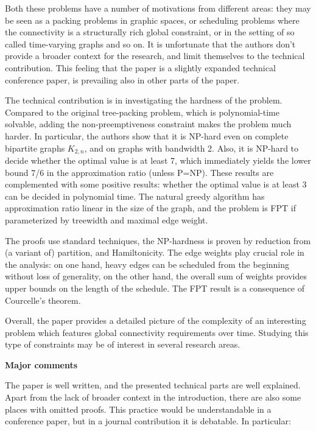 \documentclass[11pt,a4paper]{article}
\begin{document}
Both these problems have a number of motivations from different areas: they may
be seen as a packing problems in graphic spaces, or scheduling problems where
the connectivity is a structurally rich global constraint, or in the setting of
so called time-varying graphs and so on. It is unfortunate that the authors
don't provide a broader context for the research, and limit themselves to the
technical contribution. This feeling that the paper is a slightly expanded
technical conference paper, is prevailing also in other parts of the paper.

The technical contribution is in investigating the hardness of the problem.
Compared to the original tree-packing problem, which is polynomial-time
solvable, adding the non-preemptiveness constraint makes the problem much
harder.  In particular, the authors show that it is NP-hard even on complete
bipartite graphs $K_{2,n}$, and on graphs with bandwidth 2. Also, it is NP-hard to
decide whether the optimal value is at least 7, which immediately yields the
lower bound 7/6 in the approximation ratio (unless P=NP). These results are
complemented with some positive results: whether the optimal value is at least 3
can be decided in polynomial time. The natural greedy algorithm has
approximation ratio linear in the size of the graph, and the problem is FPT if
parameterized by treewidth and maximal edge weight.

The proofs use standard techniques, the NP-hardness is proven by reduction from
(a variant of) partition, and Hamiltonicity. The edge weights play crucial role
in the analysis: on one hand, heavy edges can be scheduled from the beginning
without loss of generality, on the other hand, the overall sum of weights
provides upper bounds on the length of the schedule.  The FPT result is a
consequence of Courcelle's theorem.

Overall, the paper provides a detailed picture of the complexity of an
interesting problem which features global connectivity requirements over time.
Studying this type of constraints may be of interest in several research
areas.

\textbf{Major comments}

The paper is well written, and the presented technical parts are well
explained.  Apart from the lack of broader context in the introduction, there
are also some places with omitted proofs. This practice would be understandable
in a conference paper, but in a journal contribution it is debatable. In
particular:
\end{document}
